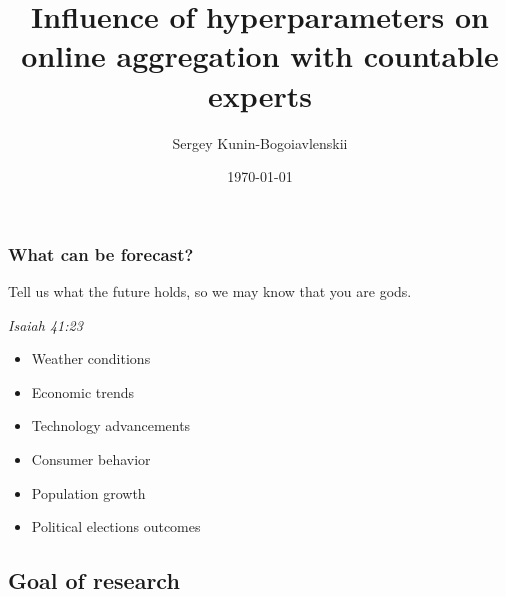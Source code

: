 \documentclass{beamer}
\title[\hbox to 56mm{Online expert aggregation}]{Influence of hyperparameters on online aggregation with countable experts}
\author[N.\,P.~Ivkin]{Sergey Kunin-Bogoiavlenskii}
\institute[MIPT] %
{
Moscow Institute of Physics and Technology \\ %
\medskip
\textit{kunin-bogoiavlenskii.sm@phystech.edu} %
\par\smallskip\emph{Expert:} R.\,D.~Zukhba
\par\smallskip\emph{Consultant:} A.\,V.~Zukhba
}
\date{\today}
\begin{document}
\begin{frame}
\thispagestyle{empty}
\maketitle
\end{frame}



\begin{frame}
\frametitle{What can be forecast?}
\setlength{\epigraphwidth}{0.45\textwidth}

\epigraph{Tell us what the future holds, so we may know that you are gods.}{\textit{Isaiah 41:23}}
%
\begin{itemize}
\item Weather conditions
\item Economic trends
\item Technology advancements
\item Consumer behavior
\item Population growth
\item Political elections outcomes

\end{itemize}
\end{frame}


\subsection{Goal of research} 
\end{document}
